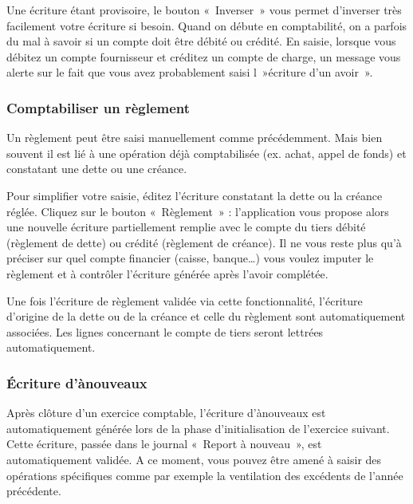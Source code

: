 \documentclass[a4paper,10pt,oneside,french]{sphinxmanual}
\begin{document}

Une écriture étant provisoire, le bouton « Inverser » vous permet d’inverser très facilement votre écriture si besoin.
Quand on débute en comptabilité, on a parfois du mal à savoir si un compte doit être débité ou crédité.
En saisie, lorsque vous débitez un compte fournisseur et créditez un compte de charge, un message vous alerte sur le fait que vous avez probablement saisi l »écriture d’un avoir ».


\subsubsection{Comptabiliser un règlement}
\label{\detokenize{accounting/entity:comptabiliser-un-reglement}}
Un règlement peut être saisi manuellement comme précédemment. Mais bien souvent il est lié à une opération déjà comptabilisée  (ex. achat, appel de fonds) et constatant une dette ou une créance.

Pour simplifier votre saisie, éditez l’écriture constatant la dette ou la créance réglée. Cliquez sur le bouton « Règlement » : l’application vous propose alors une nouvelle écriture partiellement remplie avec le compte du tiers débité (règlement de dette) ou crédité (règlement de créance).
Il ne vous reste plus qu’à préciser sur quel compte financier (caisse, banque…) vous voulez imputer le règlement et à contrôler l’écriture générée après l’avoir complétée.

Une fois l’écriture de règlement validée via cette fonctionnalité, l’écriture d’origine de la dette ou de la créance et celle du règlement sont automatiquement associées. Les lignes concernant le compte de tiers seront lettrées automatiquement.


\subsubsection{Écriture d’à\sphinxhyphen{}nouveaux}
\label{\detokenize{accounting/entity:ecriture-d-a-nouveaux}}
Après clôture d’un exercice comptable, l’écriture d’à\sphinxhyphen{}nouveaux est automatiquement générée lors de la phase d’initialisation de l’exercice suivant. Cette écriture, passée dans le journal « Report à nouveau », est automatiquement validée.
A ce moment, vous pouvez être amené à saisir des opérations spécifiques comme par exemple la ventilation des excédents de l’année précédente.
\end{document}
